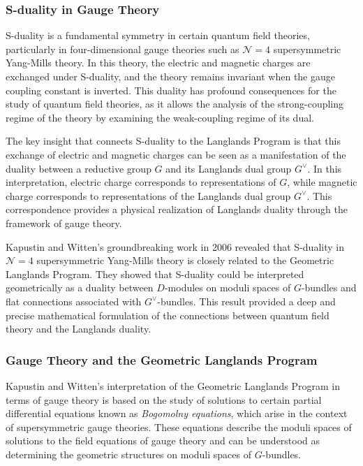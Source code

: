 \documentclass{article}
\theoremstyle{remark}
\begin{document}
\subsubsection{S-duality in Gauge Theory}

S-duality is a fundamental symmetry in certain quantum field theories, particularly in four-dimensional gauge theories such as $\mathcal{N}=4$ supersymmetric Yang-Mills theory. In this theory, the electric and magnetic charges are exchanged under S-duality, and the theory remains invariant when the gauge coupling constant is inverted. This duality has profound consequences for the study of quantum field theories, as it allows the analysis of the strong-coupling regime of the theory by examining the weak-coupling regime of its dual.

The key insight that connects S-duality to the Langlands Program is that this exchange of electric and magnetic charges can be seen as a manifestation of the duality between a reductive group $G$ and its Langlands dual group $G^\vee$. In this interpretation, electric charge corresponds to representations of $G$, while magnetic charge corresponds to representations of the Langlands dual group $G^\vee$. This correspondence provides a physical realization of Langlands duality through the framework of gauge theory.

Kapustin and Witten’s groundbreaking work in 2006 revealed that S-duality in $\mathcal{N}=4$ supersymmetric Yang-Mills theory is closely related to the Geometric Langlands Program. They showed that S-duality could be interpreted geometrically as a duality between $D$-modules on moduli spaces of $G$-bundles and flat connections associated with $G^\vee$-bundles. This result provided a deep and precise mathematical formulation of the connections between quantum field theory and the Langlands duality.

\subsubsection{Gauge Theory and the Geometric Langlands Program}

Kapustin and Witten’s interpretation of the Geometric Langlands Program in terms of gauge theory is based on the study of solutions to certain partial differential equations known as \emph{Bogomolny equations}, which arise in the context of supersymmetric gauge theories. These equations describe the moduli spaces of solutions to the field equations of gauge theory and can be understood as determining the geometric structures on moduli spaces of $G$-bundles.
\end{document}
